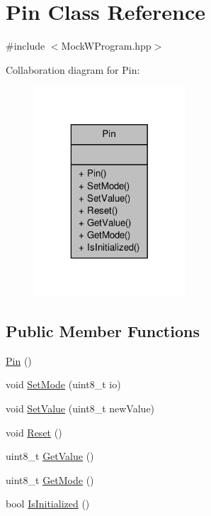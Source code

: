 \hypertarget{class_pin}{\section{Pin Class Reference}
\label{class_pin}
}


{\ttfamily \#include $<$Mock\-W\-Program.\-hpp$>$}



Collaboration diagram for Pin\-:\nopagebreak
\begin{figure}[H]
\begin{center}
\leavevmode
\includegraphics[width=160pt]{class_pin__coll__graph}
\end{center}
\end{figure}
\subsection*{Public Member Functions}
\begin{DoxyCompactItemize}
\item 
\hyperlink{class_pin_aaf3d92065cd9b9de91f01164bec418ea}{Pin} ()
\item 
void \hyperlink{class_pin_a818cf19e4b42d2777326c52a56ae4ea9}{Set\-Mode} (uint8\-\_\-t io)
\item 
void \hyperlink{class_pin_adc8d5cd4aeca8cce795e85b3fe1d9a20}{Set\-Value} (uint8\-\_\-t new\-Value)
\item 
void \hyperlink{class_pin_a63ccf03925afd8dc45e5ad5aabc5342a}{Reset} ()
\item 
uint8\-\_\-t \hyperlink{class_pin_a9c39b8c7ef953b40043e97fecb8b35dd}{Get\-Value} ()
\item 
uint8\-\_\-t \hyperlink{class_pin_aae8f8b8ed2e268bfd63e7c06e1d845fd}{Get\-Mode} ()
\item 
bool \hyperlink{class_pin_a56f7dc430291a53b5c08df50c8f43f9a}{Is\-Initialized} ()
\end{DoxyCompactItemize}


